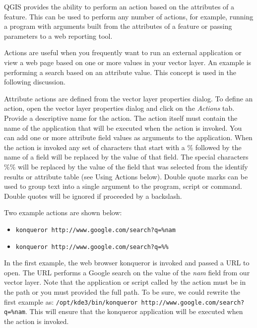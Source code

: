QGIS provides the ability to perform an action based on the attributes of a
feature. This can be used to perform any number of actions, for example,
running a program with arguments built from the attributes of a feature or
passing parameters to a web reporting tool.

Actions are useful when you frequently want to run an external application or
view a web page based on one or more values in your vector layer. An example
is performing a search based on an attribute value. This concept is used in 
the following discussion.


Attribute actions are defined from the vector layer properties dialog. To
define an action, open the vector layer properties dialog and click on the
\textit{Actions} tab. Provide a descriptive name for the action. The action
itself must contain the name of the application that will be executed when the
action is invoked. You can add one or more attribute field values as arguments
to the application. When the action is invoked any set of characters that
start with a \% followed by the name of a field will be replaced by the value of
that field. The special characters \%\% \index{\%\%}will be replaced by the value
of the field that was selected from the identify results or attribute table (see
Using Actions below).  Double quote marks can be used to group text into a
single argument to the program, script or command. Double quotes will be
ignored if proceeded by a backslash.  

Two example actions are shown below:

\begin{itemize}
  \item \texttt{konqueror http://www.google.com/search?q=\%nam}
  \item \texttt{konqueror http://www.google.com/search?q=\%\%}
\end{itemize}


In the first example, the web browser konqueror is invoked and passed a URL to
open. The URL performs a Google search on the value of the \textit{nam} field
from our vector layer. Note that the application or script called by the
action must be in the path or you must provided the full path. To be sure, we could
rewrite the first example as: \texttt{/opt/kde3/bin/konqueror
http://www.google.com/search?q=\%nam}. This will ensure that the konqueror
application will be executed when the action is invoked.

